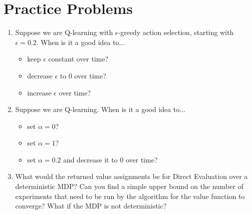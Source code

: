 \documentclass[a4paper]{article}
\newif\ifsol
\begin{document}
\section*{Practice Problems}
\begin{enumerate}
    \item Suppose we are Q-learning with $\epsilon$-greedy action selection, starting with $\epsilon = 0.2$. When is it a good idea to...
    \begin{itemize}
        \item keep $\epsilon$ constant over time?
        \item decrease $\epsilon$ to 0 over time?
        \item increase $\epsilon$ over time?
    \end{itemize}
    
    \ifsol
        \textcolor{blue}{It is generally good to decrease $\epsilon$ to 0 with time, especially when using on-policy learning methods. The reason is that as the agent learns the actual optimal policy for the world, it should switch from a mix of exploration and exploitation to mostly exploitation. However, if the world is changing, we may leave $\epsilon$ high such that the agent would continue to explore. It never makes sense to continuously increase $\epsilon$, as this counteract convergence.}
    \else
        \vspace{7em}
    \fi 
    
    \item Suppose we are Q-learning. When is it a good idea to...
    \begin{itemize}
        \item set $\alpha = 0$?
        \item set $\alpha = 1$?
        \item set $\alpha = 0.2$ and decrease it to 0 over time?
    \end{itemize}
    
    \ifsol
        \textcolor{blue}{If the learning rate $\alpha$ is set to 0, we will not make any updates to the value function, so this is never a good idea. When $\alpha$ is set to 1, we will be fully overriding prior value estimates with the new update. While this is generally undesirable, it is actually optimal for a fully deterministic MDP. The third option -- setting alpha to a low value and decreasing it over time -- is the most reasonable approach.}
    \else
        \vspace{7em}
    \fi 
    
    \item What would the returned value assignments be for Direct Evaluation over a deterministic MDP? Can you find a simple upper bound on the number of experiments that need to be run by the algorithm for the value function to converge? What if the MDP is not deterministic?
    

\end{enumerate}
\end{document}
